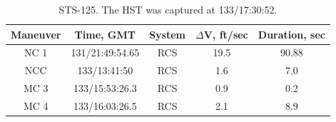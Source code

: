 \documentclass[paper=letter, fontsize=11pt]{scrartcl} %
\numberwithin{equation}{section} %
\numberwithin{figure}{section} %
\numberwithin{table}{section} %
\begin{document}

\begin{table}[H]
\begin{center}
\begin{tabular}{|c |c |c |c |c|}
\hline
Maneuver & Time, GMT & System & $\Delta$V, ft/sec & Duration, sec \\
\hline
NC 1 & 131/21:49:54.65 & RCS & 19.5 & 90.88   \\ \hline
NCC  & 133/13:41:50    & RCS &  1.6 & 7.0     \\ \hline
MC 3 & 133/15:53:26.3  & RCS &  0.9 & 0.2     \\ \hline
MC 4 & 133/16:03:26.5  & RCS &  2.1 & 8.9     \\ \hline
\end{tabular}
\end{center}
\caption{STS-125. The HST was captured at 133/17:30:52.}
\end{table}

\end{document}
